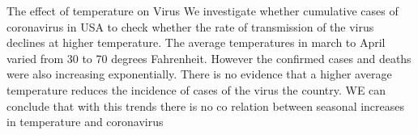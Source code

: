 \documentclass[11pt]{article}
\begin{document}
The effect of temperature on Virus
We investigate whether cumulative  cases of coronavirus in USA to check whether the rate of transmission of the virus declines at higher temperature. The average temperatures in march to April varied from 30 to 70 degrees Fahrenheit. 
However the confirmed cases and deaths were also increasing exponentially. 
There is no evidence  that a higher average temperature reduces the incidence of cases of the virus the country. WE can conclude that with this trends there is no co relation between seasonal increases in temperature and coronavirus 
\end{document}
